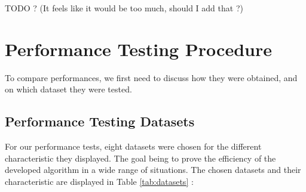 \documentclass{eplmastersthesis}
\begin{document}
TODO ? (It feels like it would be too much, should I add that ?)

\section{Performance Testing Procedure}

To compare performances, we first need to discuss how they were obtained, and on which dataset they were tested.

\subsection{Performance Testing Datasets}

For our performance tests, eight datasets were chosen for the different characteristic they displayed. The goal being to prove the efficiency of the developed algorithm in a wide range of situations. The chosen datasets and their characteristic are displayed in Table \ref{tab:datasets} : \newline
\end{document}
